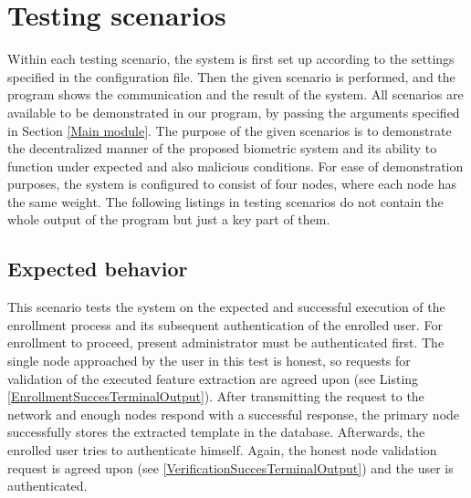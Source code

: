 \section{Testing scenarios}
Within each testing scenario, the system is first set up according to the settings specified in the configuration file. Then the given scenario is performed, and the program shows the communication and the result of the system. All scenarios are available to be demonstrated in our program, by passing the arguments specified in Section \ref{Main module}.
The purpose of the given scenarios is to demonstrate the decentralized manner of the proposed biometric system and its ability to function under expected and also malicious conditions. For ease of demonstration purposes, the system is configured to consist of four nodes, where each node has the same weight. The following listings in testing scenarios do not contain the whole output of the program but just a key part of them.
\subsection{Expected behavior}
This scenario tests the system on the expected and successful execution of the enrollment process and its subsequent authentication of the enrolled user. For enrollment to proceed, present administrator must be authenticated first. The single node approached by the user in this test is honest, so requests for validation of the executed feature extraction are agreed upon (see Listing \ref{EnrollmentSuccesTerminalOutput}). After transmitting the request to the network and enough nodes respond with a successful response, the primary node successfully stores the extracted template in the database. Afterwards, the enrolled user tries to authenticate himself. Again, the honest node validation request is agreed upon (see \ref{VerificationSuccesTerminalOutput}) and the user is authenticated.


